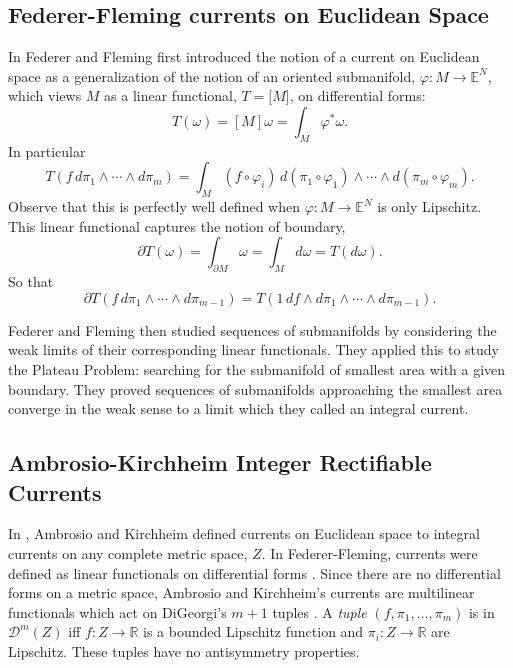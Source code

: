 \documentclass[12pt]{amsart}
\begin{document}
\subsection{Federer-Fleming currents on Euclidean Space}
In \cite{FF} Federer and Fleming first introduced the
notion of a current on Euclidean space as a generalization of the notion
of an oriented 
submanifold, $\varphi: M \to {\mathbb{E}}^N$, which views $M$ as a linear functional,
$T=\lbrack M \rbrack$, 
on differential forms:
\begin{equation}
T(\omega) = [M] \omega =\int_M \varphi^* \omega.
\end{equation}
In particular
\begin{equation}
T(f \, d\pi_1\wedge \cdots \wedge d\pi_m) =  
\int_M (f\circ \varphi_i)\,
d(\pi_1\circ \varphi_1) \wedge \cdots \wedge d(\pi_m\circ \varphi_m).
\end{equation}
Observe that this is perfectly well defined when $\varphi: M \to {\mathbb{E}}^N$
is only Lipschitz.   This linear functional captures the notion of boundary,
\begin{equation}
\partial T(\omega) = \int_{\partial M} \omega = \int_M d\omega=T (d \omega).
\end{equation}
So that
\begin{equation}
\partial T(f \, d\pi_1\wedge \cdots \wedge d\pi_{m-1})=
T(1 \, df \wedge d\pi_1\wedge \cdots \wedge d\pi_{m-1}).
\end{equation}

Federer and Fleming then studied sequences of submanifolds
by considering the weak limits of their corresponding linear functionals.
They applied this to study the Plateau Problem: searching 
for the submanifold of smallest area with a given boundary.   They proved
sequences of submanifolds approaching the smallest area converge in the
weak sense to a limit which they called an integral current.

\subsection{Ambrosio-Kirchheim Integer Rectifiable Currents}
In \cite{AK}, Ambrosio and Kirchheim defined currents on Euclidean space to integral currents on any complete metric space, $Z$.   
In Federer-Fleming, currents were defined as linear functionals on differential
forms \cite{FF}.   Since there are no differential forms on a metric space, 
Ambrosio and Kirchheim's currents are multilinear functionals which
act on 
DiGeorgi's
$m+1$ tuples \cite{DeGiorgi}.    A {\em tuple} $\left(f,\pi_1, ...,\pi_m\right)$ is in $\mathcal{D}^m(Z)$ iff
$f: Z \to {\mathbb{R}}$ is a bounded Lipschitz function and
$\pi_i: Z \to {\mathbb{R}}$ are Lipschitz.  These tuples have no antisymmetry properties.
\end{document}
